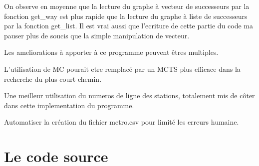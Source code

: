 \documentclass[12pt, twoside]{report}
\begin{document}
On observe en moyenne que la lecture du graphe à vecteur de successeurs par la fonction get\_way est plus rapide que la lecture du graphe à liste de successeurs par la fonction get\_list. Il est vrai aussi que l'ecriture de cette partie du code ma pauser plus de soucis que la simple manipulation de vecteur.

Les ameliorations à apporter à ce programme peuvent êtres multiples.


L'utilisation de MC pourait etre remplacé par un MCTS plus efficace dans la recherche du plus court chemin.


Une meilleur utilisation du numeros de ligne des stations, totalement mis de côter dans cette implementation du programme.


Automatiser la création du fichier metro.csv pour limité les erreurs humaine.
\printindex

\part{Le code source}
\end{document}
